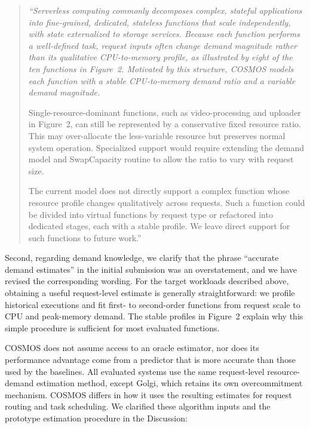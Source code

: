 \documentclass[11pt]{article}
\newenvironment{revisionquote}{\begin{quote}\itshape}{\end{quote}}
\begin{document}
\begin{revisionquote}
``Serverless computing commonly decomposes complex, stateful applications into fine-grained, dedicated, stateless functions that scale independently, with state externalized to storage services. Because each function performs a well-defined task, request inputs often change demand magnitude rather than its qualitative CPU-to-memory profile, as illustrated by eight of the ten functions in Figure~2. Motivated by this structure, COSMOS models each function with a stable CPU-to-memory demand ratio and a variable demand magnitude.

Single-resource-dominant functions, such as video-processing and uploader in Figure~2, can still be represented by a conservative fixed resource ratio. This may over-allocate the less-variable resource but preserves normal system operation. Specialized support would require extending the demand model and SwapCapacity routine to allow the ratio to vary with request size.

The current model does not directly support a complex function whose resource profile changes qualitatively across requests. Such a function could be divided into virtual functions by request type or refactored into dedicated stages, each with a stable profile. We leave direct support for such functions to future work.''
\end{revisionquote}

Second, regarding demand knowledge, we clarify that the phrase ``accurate demand estimates'' in the initial submission was an overstatement, and we have revised the corresponding wording. For the target workloads described above, obtaining a useful request-level estimate is generally straightforward: we profile historical executions and fit first- to second-order functions from request scale to CPU and peak-memory demand. The stable profiles in Figure~2 explain why this simple procedure is sufficient for most evaluated functions.

COSMOS does not assume access to an oracle estimator, nor does its performance advantage come from a predictor that is more accurate than those used by the baselines. All evaluated systems use the same request-level resource-demand estimation method, except Golgi, which retains its own overcommitment mechanism. COSMOS differs in how it uses the resulting estimates for request routing and task scheduling. We clarified these algorithm inputs and the prototype estimation procedure in the Discussion:
\end{document}
